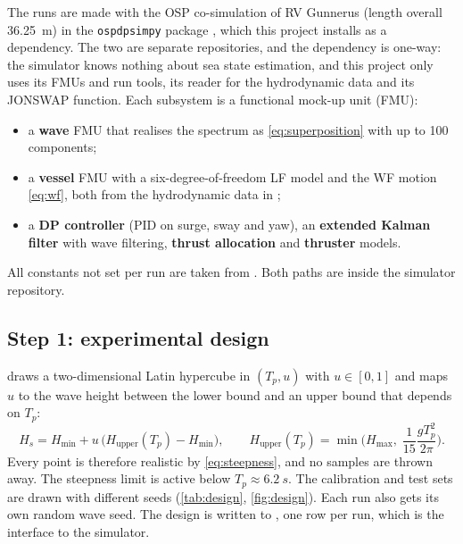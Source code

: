 \documentclass[11pt,a4paper]{article}
\newcommand{\Hs}{H_{s}}
\newcommand{\Tp}{T_{p}}
\begin{document}
The runs are made with the OSP co-simulation of RV Gunnerus (length overall \SI{36.25}{m}) in
the \texttt{ospdpsimpy} package \citep{ospdpsimpy,osp,fmi2014}, which this project installs as a
dependency. The two are separate repositories, and the dependency is one-way: the simulator
knows nothing about sea state estimation, and this project only uses its FMUs and run tools,
its reader for the hydrodynamic data and its JONSWAP function. Each subsystem is a functional
mock-up unit (FMU):
\begin{itemize}
  \item a \textbf{wave} FMU that realises the spectrum as \cref{eq:superposition} with up to
        100 components;
  \item a \textbf{vessel} FMU with a six-degree-of-freedom LF model and the WF motion
        \cref{eq:wf}, both from the hydrodynamic data in ;
  \item a \textbf{DP controller} (PID on surge, sway and yaw), an \textbf{extended Kalman
        filter} with wave filtering, \textbf{thrust allocation} and \textbf{thruster} models.
\end{itemize}
All constants not set per run are taken from . Both paths are
inside the simulator repository.

\subsection{Step 1: experimental design}
\label{sec:step1}

 draws a two-dimensional Latin hypercube in $(\Tp, u)$ with
$u \in [0,1]$ and maps $u$ to the wave height between the lower bound and an upper bound that
depends on $\Tp$:
\begin{equation}
  \Hs = H_{\min} + u\,\big(H_{\text{upper}}(\Tp) - H_{\min}\big),
  \qquad
  H_{\text{upper}}(\Tp) = \min\!\Big(H_{\max},\; \frac{1}{15}\frac{g\Tp^2}{2\pi}\Big).
\end{equation}
Every point is therefore realistic by \cref{eq:steepness}, and no samples are thrown away.
The steepness limit is active below $\Tp \approx \SI{6.2}{s}$. The calibration and test sets
are drawn with different seeds (\cref{tab:design}, \cref{fig:design}). Each run also gets its
own random wave seed. The design is written to , one row per run, which is
the interface to the simulator.
\end{document}
